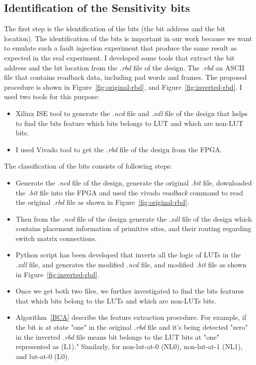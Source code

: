 \subsection{Identification of the Sensitivity bits}
\label{SE-bits}
The first step is the identification of the bits (the bit address and the bit location). The identification of the bits is important in our work because we want to emulate such a fault injection experiment that produce the same result as expected in the real experiment.
I developed some tools that extract the bit address and the bit location from the \textit{.rbd }file of the design. The \textit{.rbd} an ASCII file that contains readback data, including pad words and frames.
The proposed procedure is shown in Figure~\ref{fig:original-rbd}, and Figure~\ref{fig:inverted-rbd}.  I used two tools for this purpose: 
\begin{itemize}
\item Xilinx ISE tool to generate the \textit{.ncd} file and \textit{.xdl} file of the design that helps to find the bits feature which bits belongs to LUT and which are non-LUT bits.
\item I used Vivado tool to get the \textit{.rbd} file of the design from the FPGA.


\end{itemize}

The classification of the bits consists of following steps:
\begin{itemize}
\item Generate the \textit{.ncd} file of the design, generate the original \textit{.bit} file, downloaded the \textit{.bit} file into the FPGA and used the vivado \textit{readback} command to read the original \textit{.rbd} file as shown in Figure~\ref{fig:original-rbd}.
\item Then from the \textit{.ncd} file of the design generate the \textit{.xdl} file of the design  which contains placement information of primitive sites, and their routing regarding switch matrix connections.
\item Python script has been developed that inverts all the logic of LUTs in the \textit{.xdl} file, and generates the modified \textit{.ncd} file, and modified \textit{.bit} file as shown in Figure~\ref{fig:inverted-rbd}.
\item Once we get both two files, we further investigated to find the bits features that which bits belong to the LUTs and which are non-LUTs bits.
\item Algorithm~\ref{BCA} describe the feature extraction procedure. For example, if the bit is at state "one" in the original \textit{.rbd} file and it's being detected "zero" in the inverted \textit{.rbd} file means bit belongs to the LUT bits at "one" represented as (L1)." Similarly, for non-lut-at-0 (NL0), non-lut-at-1 (NL1), and lut-at-0 (L0). 
\end{itemize}

